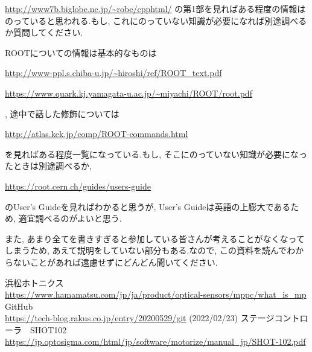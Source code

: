 \documentclass[uplatex,10pt,a4j]{jsarticle}
\begin{document}
\url{http://www7b.biglobe.ne.jp/~robe/cpphtml/}
の第1部を見ればある程度の情報はのっていると思われる.もし, これにのっていない知識が必要になれば別途調べるか質問してください.

ROOTについての情報は基本的なものは

\url{http://www-ppl.s.chiba-u.jp/~hiroshi/ref/ROOT_text.pdf}

\url{https://www.quark.kj.yamagata-u.ac.jp/~miyachi/ROOT/root.pdf}

, 途中で話した修飾については

\url{http://atlas.kek.jp/comp/ROOT-commands.html}

を見ればある程度一覧になっている.もし, そこにのっていない知識が必要になったときは別途調べるか, 

\url{https://root.cern.ch/guides/users-guide}

のUser's Guideを見ればわかると思うが, User's Guideは英語の上膨大であるため, 適宜調べるのがよいと思う.

また, あまり全てを書きすぎると参加している皆さんが考えることがなくなってしまうため, あえて説明をしていない部分もある.なので, この資料を読んでわからないことがあれば遠慮せずにどんどん聞いてください.

\begin{thebibliography}{9}
  浜松ホトニクス\\
  \url{https://www.hamamatsu.com/jp/ja/product/optical-sensors/mppc/what_is_mp}
  GitHub\\
  \url{https://tech-blog.rakus.co.jp/entry/20200529/git} (2022/02/23)
  ステージコントローラ　SHOT102\\
  \url{https://jp.optosigma.com/html/jp/software/motorize/manual_jp/SHOT-102.pdf}
\end{thebibliography}
\end{document}
